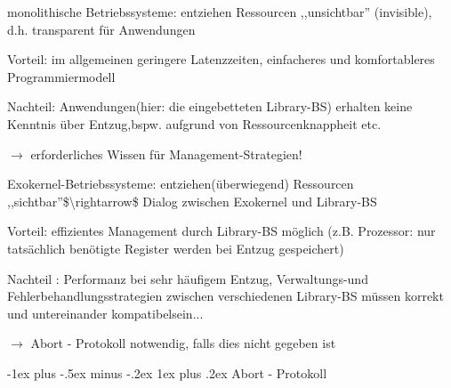 \documentclass[a4paper]{article}
\makeatletter
\renewcommand{\subsubsection}{\@startsection{subsubsection}{3}{0mm}%
 {-1ex plus -.5ex minus -.2ex}%
 {1ex plus .2ex}%
 {\normalfont\small\bfseries}}
\makeatother
\begin{document}
\begin{multicols}{3}
    \begin{itemize*}
        \item
        monolithische Betriebssysteme: entziehen Ressourcen ,,unsichtbar''
        (invisible), d.h. transparent für Anwendungen
        \begin{itemize*}
            \item Vorteil: im allgemeinen geringere Latenzzeiten, einfacheres und komfortableres Programmiermodell
            \item Nachteil: Anwendungen(hier: die eingebetteten Library-BS) erhalten keine Kenntnis über Entzug,bspw. aufgrund von Ressourcenknappheit etc.
            \item $\rightarrow$  erforderliches Wissen für Management-Strategien!
        \end{itemize*}
        \item
        Exokernel-Betriebssysteme: entziehen(überwiegend) Ressourcen
        ,,sichtbar''\$\textbackslash rightarrow\$ Dialog zwischen Exokernel
        und Library-BS
        \begin{itemize*}
            \item Vorteil: effizientes Management durch Library-BS möglich (z.B. Prozessor: nur tatsächlich benötigte Register werden bei Entzug gespeichert)
            \item Nachteil : Performanz bei sehr häufigem Entzug, Verwaltungs-und Fehlerbehandlungsstrategien zwischen verschiedenen Library-BS müssen korrekt und untereinander kompatibelsein...
            \item $\rightarrow$  Abort - Protokoll notwendig, falls dies nicht gegeben ist
        \end{itemize*}
    \end{itemize*}


    \subsubsection{Abort - Protokoll}


\end{multicols}
\end{document}

